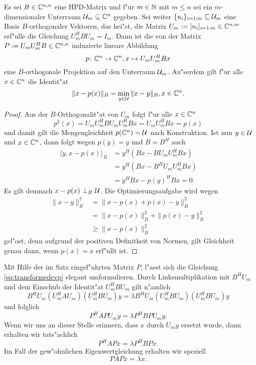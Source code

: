 \begin{thm}
Es sei $B\in\mathbb{C}^{n,n}$ eine HPD-Matrix und f"ur $m\in\mathbb{N}$ mit $m\le n$ sei
ein $m$-dimensionaler Unterraum $\mathcal{U}_m \subseteq \mathbb{C}^n$ gegeben. Sei weiter $\{u_i\}_{i=1:m}\subseteq\mathcal{U}_m$ eine
Basis $B$-orthogonaler Vektoren, das hei"st, die Matrix $U_m := [u_i]_{i=1:m}
\in\mathbb{C}^{n,m}$ erf"ulle die Gleichung $U_m^H B U_m = I_m$. Dann ist die von der Matrix
 $P := U_m U_m^H B \in \mathbb{C}^{n,n}$ induzierte lineare Abbildung
\[
p \colon \mathbb{C}^n \to \mathbb{C}^n, x\mapsto U_m U_m^H Bx
\]
eine $B$-orthogonale Projektion auf den Unterraum $\mathcal{U}_m$. Au"serdem gilt
f"ur alle $x\in\mathbb{C}^n$ die Identit"at
\[
\|x-p(x)\|_B = \min_{y\in\mathcal{U}} \|x - y\|_B, x\in\mathbb{C}^n.
\]
\end{thm}

\begin{proof}
Aus der $B$-Orthogonalit"at von $U_m$ folgt f"ur alle $x\in\mathbb{C}^n$
\[
p^2 (x) = U_m U_m^H B U_m U_m^H B x= U_m U_m^H Bx = p(x)
\]
und damit gilt die Mengengleichheit $p(\mathbb{C}^n) = \mathcal{U}$ nach Konstruktion. %
Ist nun $y\in\mathcal{U}$ und $x\in\mathbb{C}^n$, dann folgt wegen $p(y) = y$ und $B=B^H$ auch
\begin{align*}
\langle y, x-p(x)\rangle_B &= y^H (Bx - B U_m U_m^H Bx) \\
&= y^H (Bx - B^H U_m U_m^H Bx) \\
&= y^H Bx - p(y)^H Bx = 0.
\end{align*}
Es gilt demnach $x-p(x) \ \bot_B \ \mathcal{U}$. Die Optimierungsaufgabe wird wegen
\begin{align*}
\|x-y\|_B^2 &= \|x-p(x) + p(x)-y\|_B^2 \\
&= \|x-p(x)\|_B^2 + \|p(x)-y\|_B^2\\
&\ge \|x-p(x)\|_B^2
\end{align*}
gel"ost, denn aufgrund der positiven Definitheit von Normen, gilt Gleichheit genau dann,
wenn $p(x)=x$ erf"ullt ist.
\end{proof}

Mit Hilfe der im Satz eingef"uhrten Matrix $P$, l"asst sich die Gleichung
\eqref{eq:transformedevp} elegant umformulieren. Durch Linksmultiplikation
mit $B^H U_m$ und dem Einschub der Identit"at $U_m^H B U_m$ gilt n"amlich
\[
B^H U_m (U_m^H A U_m)(U_m^H B U_m)y = \lambda B^H U_m (U_m^H B U_m)(U_m^H B U_m)y
\]
und folglich
\[
P^H A P U_m y = \lambda P^H B P U_m y.
\]
Wenn wir uns an dieser Stelle erinnern, dass $x$ durch $U_m y$ ersetzt wurde, dann
erhalten wir tats"achlich
\[
P^H A P x = \lambda P^H B P x.
\]
Im Fall der gew"ohnlichen Eigenwertgleichung erhalten wir speziell
\[
P A P x = \lambda x.
\]

